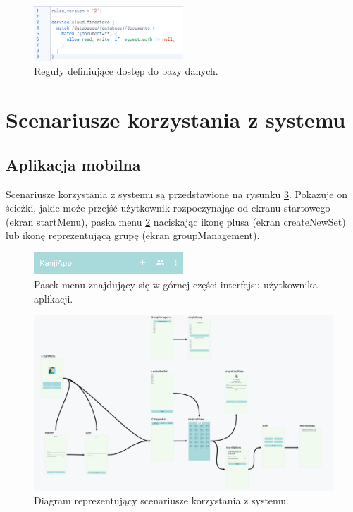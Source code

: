 \documentclass[a4paper,twoside,12pt]{book}
\begin{document}
\begin{figure}[]
\centering
\includegraphics[width=0.5\textwidth]{Firestore}
\caption{Reguły definiujące dostęp do bazy danych.}
\label{fig:etykieta-rysunku}
\end{figure}

\section{Scenariusze korzystania z systemu}

\subsection{Aplikacja mobilna}

Scenariusze korzystania z systemu są przedstawione na rysunku \ref{fig:navgraph}. Pokazuje on ścieżki, jakie może przejść użytkownik rozpoczynając od ekranu startowego (ekran startMenu), paska menu \ref{fig:menu} naciskając ikonę plusa (ekran createNewSet) lub ikonę reprezentującą grupę (ekran groupManagement). 

\begin{figure}[]
\centering
\includegraphics[width=0.5\textwidth]{menu}
\caption{Pasek menu znajdujący się w górnej części interfejsu użytkownika aplikacji.}
\label{fig:menu}
\end{figure}

\begin{figure}[]
\centering
\includegraphics[width=\textwidth]{Navgraph}
\caption{Diagram reprezentujący scenariusze korzystania z systemu.}
\label{fig:navgraph}
\end{figure}
\end{document}
